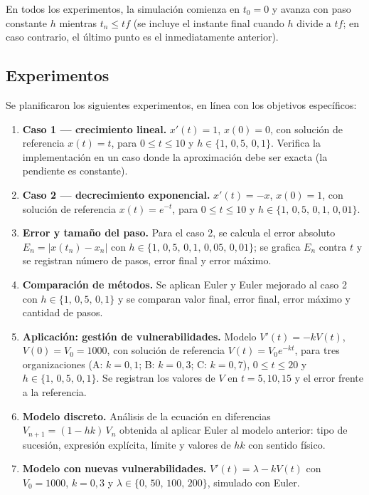 \documentclass[11pt,a4paper]{article}
\begin{document}
En todos los experimentos, la simulación comienza en $t_0 = 0$ y avanza con
paso constante $h$ mientras $t_n \le tf$ (se incluye el instante final cuando
$h$ divide a $tf$; en caso contrario, el último punto es el inmediatamente
anterior).

\subsection{Experimentos}

Se planificaron los siguientes experimentos, en línea con los objetivos
específicos:

\begin{enumerate}
  \item \textbf{Caso 1 --- crecimiento lineal.}
        $x'(t) = 1$, $x(0) = 0$, con solución de referencia $x(t) = t$,
        para $0 \le t \le 10$ y $h \in \{1,\, 0{,}5,\, 0{,}1\}$.
        Verifica la implementación en un caso donde la aproximación debe ser
        exacta (la pendiente es constante).
  \item \textbf{Caso 2 --- decrecimiento exponencial.}
        $x'(t) = -x$, $x(0) = 1$, con solución de referencia $x(t) = e^{-t}$,
        para $0 \le t \le 10$ y $h \in \{1,\, 0{,}5,\, 0{,}1,\, 0{,}01\}$.
  \item \textbf{Error y tamaño del paso.}
        Para el caso 2, se calcula el error absoluto
        $E_n = |x(t_n) - x_n|$ con $h \in \{1,\, 0{,}5,\, 0{,}1,\, 0{,}05,\,
        0{,}01\}$; se grafica $E_n$ contra $t$ y se registran número de pasos,
        error final y error máximo.
  \item \textbf{Comparación de métodos.}
        Se aplican Euler y Euler mejorado al caso 2 con
        $h \in \{1,\, 0{,}5,\, 0{,}1\}$ y se comparan valor final, error final,
        error máximo y cantidad de pasos.
  \item \textbf{Aplicación: gestión de vulnerabilidades.}
        Modelo $V'(t) = -k V(t)$, $V(0) = V_0 = 1000$, con solución de
        referencia $V(t) = V_0 e^{-kt}$, para tres organizaciones
        (A: $k = 0{,}1$; B: $k = 0{,}3$; C: $k = 0{,}7$),
        $0 \le t \le 20$ y $h \in \{1,\, 0{,}5,\, 0{,}1\}$.
        Se registran los valores de $V$ en $t = 5, 10, 15$ y el error frente
        a la referencia.
  \item \textbf{Modelo discreto.}
        Análisis de la ecuación en diferencias
        $V_{n+1} = (1 - hk)\, V_n$ obtenida al aplicar Euler al modelo
        anterior: tipo de sucesión, expresión explícita, límite y valores de
        $hk$ con sentido físico.
  \item \textbf{Modelo con nuevas vulnerabilidades.}
        $V'(t) = \lambda - k V(t)$ con $V_0 = 1000$, $k = 0{,}3$ y
        $\lambda \in \{0,\, 50,\, 100,\, 200\}$, simulado con Euler.
\end{enumerate}
\end{document}
